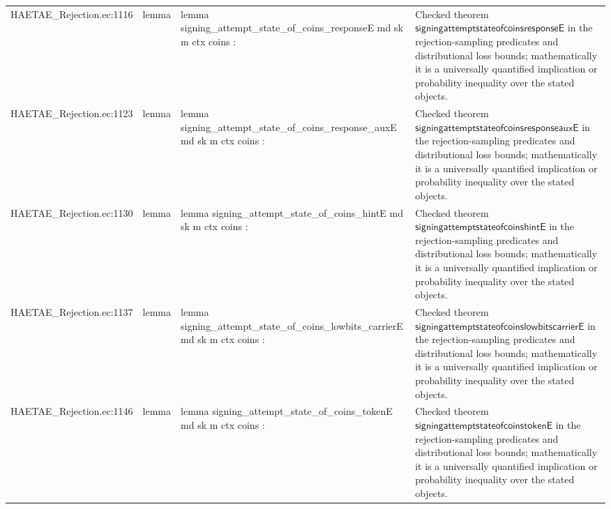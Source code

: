\documentclass[10pt]{article}
\begin{document}
\begin{longtable}{L{0.11\textwidth}L{0.055\textwidth}L{0.385\textwidth}L{0.41\textwidth}}
HAETAE\_\allowbreak{}Rejection.\allowbreak{}ec:\allowbreak{}1116 & lemma & {\ttfamily\scriptsize lemma signing\_\allowbreak{}attempt\_\allowbreak{}state\_\allowbreak{}of\_\allowbreak{}coins\_\allowbreak{}responseE md sk m ctx coins :} & Checked theorem $\mathsf{signingattemptstateofcoinsresponseE}$ in the rejection-sampling predicates and distributional loss bounds; mathematically it is a universally quantified implication or probability inequality over the stated objects. \\
HAETAE\_\allowbreak{}Rejection.\allowbreak{}ec:\allowbreak{}1123 & lemma & {\ttfamily\scriptsize lemma signing\_\allowbreak{}attempt\_\allowbreak{}state\_\allowbreak{}of\_\allowbreak{}coins\_\allowbreak{}response\_\allowbreak{}auxE md sk m ctx coins :} & Checked theorem $\mathsf{signingattemptstateofcoinsresponseauxE}$ in the rejection-sampling predicates and distributional loss bounds; mathematically it is a universally quantified implication or probability inequality over the stated objects. \\
HAETAE\_\allowbreak{}Rejection.\allowbreak{}ec:\allowbreak{}1130 & lemma & {\ttfamily\scriptsize lemma signing\_\allowbreak{}attempt\_\allowbreak{}state\_\allowbreak{}of\_\allowbreak{}coins\_\allowbreak{}hintE md sk m ctx coins :} & Checked theorem $\mathsf{signingattemptstateofcoinshintE}$ in the rejection-sampling predicates and distributional loss bounds; mathematically it is a universally quantified implication or probability inequality over the stated objects. \\
HAETAE\_\allowbreak{}Rejection.\allowbreak{}ec:\allowbreak{}1137 & lemma & {\ttfamily\scriptsize lemma signing\_\allowbreak{}attempt\_\allowbreak{}state\_\allowbreak{}of\_\allowbreak{}coins\_\allowbreak{}lowbits\_\allowbreak{}carrierE md sk m ctx coins :} & Checked theorem $\mathsf{signingattemptstateofcoinslowbitscarrierE}$ in the rejection-sampling predicates and distributional loss bounds; mathematically it is a universally quantified implication or probability inequality over the stated objects. \\
HAETAE\_\allowbreak{}Rejection.\allowbreak{}ec:\allowbreak{}1146 & lemma & {\ttfamily\scriptsize lemma signing\_\allowbreak{}attempt\_\allowbreak{}state\_\allowbreak{}of\_\allowbreak{}coins\_\allowbreak{}tokenE md sk m ctx coins :} & Checked theorem $\mathsf{signingattemptstateofcoinstokenE}$ in the rejection-sampling predicates and distributional loss bounds; mathematically it is a universally quantified implication or probability inequality over the stated objects. \\

\end{longtable}
\end{document}
